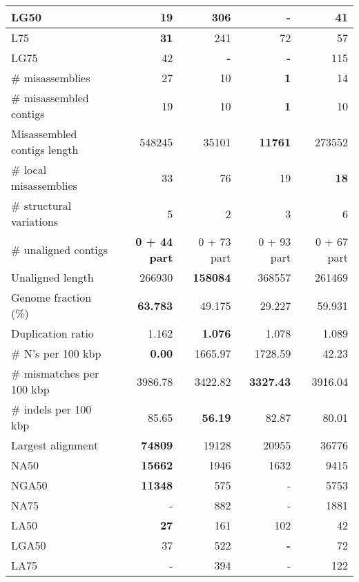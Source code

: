 \documentclass[12pt,a4paper]{article}
\begin{document}
\begin{table}[ht]
\begin{center}
\begin{tabular}{|l*{4}{|r}|}
LG50 & 19 & 306 & {\bf -} & 41 \\ \hline
L75 & {\bf 31} & 241 & 72 & 57 \\ \hline
LG75 & 42 & {\bf -} & {\bf -} & 115 \\ \hline
\# misassemblies & 27 & 10 & {\bf 1} & 14 \\ \hline
\# misassembled contigs & 19 & 10 & {\bf 1} & 10 \\ \hline
Misassembled contigs length & 548245 & 35101 & {\bf 11761} & 273552 \\ \hline
\# local misassemblies & 33 & 76 & 19 & {\bf 18} \\ \hline
\# structural variations & 5 & 2 & 3 & 6 \\ \hline
\# unaligned contigs & {\bf 0 + 44 part} & 0 + 73 part & 0 + 93 part & 0 + 67 part \\ \hline
Unaligned length & 266930 & {\bf 158084} & 368557 & 261469 \\ \hline
Genome fraction (\%) & {\bf 63.783} & 49.175 & 29.227 & 59.931 \\ \hline
Duplication ratio & 1.162 & {\bf 1.076} & 1.078 & 1.089 \\ \hline
\# N's per 100 kbp & {\bf 0.00} & 1665.97 & 1728.59 & 42.23 \\ \hline
\# mismatches per 100 kbp & 3986.78 & 3422.82 & {\bf 3327.43} & 3916.04 \\ \hline
\# indels per 100 kbp & 85.65 & {\bf 56.19} & 82.87 & 80.01 \\ \hline
Largest alignment & {\bf 74809} & 19128 & 20955 & 36776 \\ \hline
NA50 & {\bf 15662} & 1946 & 1632 & 9415 \\ \hline
NGA50 & {\bf 11348} & 575 & - & 5753 \\ \hline
NA75 & - & 882 & - & 1881 \\ \hline
LA50 & {\bf 27} & 161 & 102 & 42 \\ \hline
LGA50 & 37 & 522 & {\bf -} & 72 \\ \hline
LA75 & - & 394 & - & 122 \\ \hline
\end{tabular}
\end{center}
\end{table}
\end{document}
